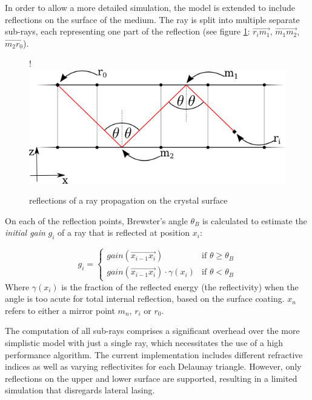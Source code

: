 In order to allow a more detailed simulation, the model is extended to include
reflections on the surface of the medium. The ray is split into multiple
separate sub-rays, each representing one part of the reflection (see figure
\ref{graphic:reflections_2D}: $\overrightarrow{r_im_1}$,
$\overrightarrow{m_1m_2}$, $\overrightarrow{m_2r_0}$).


\begin{figure}
  \centerline{
     {!} {\includegraphics{./graphics/reflections_1.png}}
  }
  \caption{reflections of a ray propagation on the crystal surface}
  \label{graphic:reflections_2D}
\end{figure}


On each of the reflection points, Brewster's angle $\theta_{B}$ is calculated to estimate the
\emph{initial gain} $g_i$ of a ray that is reflected at position $x_i$:

\begin{equation}
\label{eq:gain_reflection}
  g_i = 
  \begin{cases}
    gain(\overrightarrow{x_{i-1}x_i}) & \text{if } \theta \ge \theta_{B}  \\
    gain(\overrightarrow{x_{i-1}x_i}) \cdot \gamma(x_i) & \text{if } \theta < \theta_{B}   
  \end{cases}
\end{equation}
Where $\gamma(x_i)$ is the fraction of the reflected energy (the reflectivity)
when the angle is too acute for total internal reflection, based on the surface
coating. $x_n$ refers to
either a mirror point $m_n$, $r_i$ or $r_0$.

The computation of all sub-rays comprises a significant overhead over the more
simplistic model with just a single ray, which necessitates the use of a high
performance algorithm.  The current implementation includes different refractive
indices as well as varying reflectivites for each Delaunay triangle. However,
only reflections on the upper and lower surface are supported, resulting in a
limited simulation that disregards lateral lasing. 


